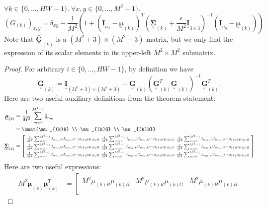 \documentclass{article}
\def\vt#1{\underline{\mathbf{#1}}}
\def\vts#1{\underline{\boldsymbol{#1}}}
\def\mt#1{\underline{\underline{\mathbf{#1}}}}
\def\mts#1{\underline{\underline{\boldsymbol{#1}}}}
\begin{document}
\begin{lemma}\label{lemma4}
    $\forall k\in\{0,\dots,HW-1\}.\ \forall x,y\in\{0,\dots, M^2-1\}.$
    $$\left({\bar{G}}_{(k)}\right)_{x,y} = \delta_{xy} - \frac1{M^2}\left(1 + \left(\vt{I}_{n_x} - \vts \mu_{(k)}\right)^T \left(\mts \Sigma_{(k)} + \frac\epsilon{M^2} \mt{I}_{3\times 3}\right)^{-1} \left(\vt{I}_{n_y} - \vts \mu_{(k)}\right) \right)$$
    Note that $\mt{\bar{G}}_{(k)}$ is a $(M^2+3)\times (M^2+3)$ matrix, but we only find the expression of its scalar elements in its upper-left $M^2\times M^2$ submatrix.
    \begin{proof}
        For arbitrary $i\in\{0,\dots,HW-1\}$, by definition we have
        $$\mt{\bar{G}}_{(k)} = \mt I_{(M^2+3)\times(M^2+3)} - \mt G_{(k)}\left(\mt G_{(k)}^T \mt G_{(k)} \right)^{-1} \mt G_{(k)}^T.$$
        Here are two useful auxiliary definitions from the theorem statement:
        \begin{align*}
            \vts \mu_{(k)} &= \frac1{M^2} \sum_{m=0}^{M^2-1} \vt I_{n_m} \\
            &= \bmat{\mu_{(k)R} \\ \mu_{(k)G} \\ \mu_{(k)B}}\\
            \mts \Sigma_{(k)} &= \left[\begin{smallmatrix}
                \frac1{M^2} \sum_{m=0}^{M^2-1} I_{n_m,R}I_{n_m,R} - \mu_{(k)R}\mu_{(k)R} & \frac1{M^2} \sum_{m=0}^{M^2-1} I_{n_m,R}I_{n_m,G} - \mu_{(k)R}\mu_{(k)G} & \frac1{M^2} \sum_{m=0}^{M^2-1} I_{n_m,R}I_{n_m,B} - \mu_{(k)R}\mu_{(k)B}\\
                \frac1{M^2} \sum_{m=0}^{M^2-1} I_{n_m,G}I_{n_m,R} - \mu_{(k)G}\mu_{(k)R} & \frac1{M^2} \sum_{m=0}^{M^2-1} I_{n_m,G}I_{n_m,G} - \mu_{(k)G}\mu_{(k)G} & \frac1{M^2} \sum_{m=0}^{M^2-1} I_{n_m,G}I_{n_m,B} - \mu_{(k)G}\mu_{(k)B}\\
                \frac1{M^2} \sum_{m=0}^{M^2-1} I_{n_m,B}I_{n_m,R} - \mu_{(k)B}\mu_{(k)R} & \frac1{M^2} \sum_{m=0}^{M^2-1} I_{n_m,B}I_{n_m,G} - \mu_{(k)B}\mu_{(k)G} & \frac1{M^2} \sum_{m=0}^{M^2-1} I_{n_m,B}I_{n_m,B} - \mu_{(k)B}\mu_{(k)B}
           \end{smallmatrix}\right]
        \end{align*}
        Here are two useful expressions:
        \begin{align*}
            M^2 \vts\mu_{(k)}\vts\mu_{(k)}^T &= \left[\begin{smallmatrix}
                M^2 \mu_{(k)R}\mu_{(k)R} & M^2 \mu_{(k)R}\mu_{(k)G} & M^2 \mu_{(k)R}\mu_{(k)B} \\

\end{smallmatrix}
\end{align*}
\end{proof}
\end{lemma}
\end{document}
